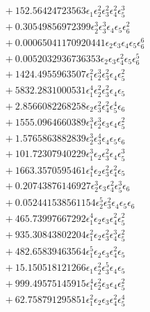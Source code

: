 \documentclass[10pt]{article}
\begin{document}
\begin{align*}
&{}  + 152.56424723563 \epsilon_{1} \epsilon_{2}^{2} \epsilon_{3}^{2} \epsilon_{4}^{2} \epsilon_{5}^{3} \\
&{}  + 0.30549856972399 \epsilon_{2}^{3} \epsilon_{3}^{3} \epsilon_{4} \epsilon_{5} \epsilon_{6}^{2} \\
&{}  + 0.00065041170920441 \epsilon_{2} \epsilon_{3} \epsilon_{4} \epsilon_{5} \epsilon_{6}^{6} \\
&{}  + 0.0052032936736353 \epsilon_{2} \epsilon_{3} \epsilon_{4}^{2} \epsilon_{5} \epsilon_{6}^{5} \\
&{}  + 1424.4955963507 \epsilon_{1}^{2} \epsilon_{2}^{3} \epsilon_{3}^{2} \epsilon_{4} \epsilon_{5}^{2} \\
&{}  + 5832.2831000531 \epsilon_{1}^{4} \epsilon_{2}^{2} \epsilon_{3}^{2} \epsilon_{4} \epsilon_{5} \\
&{}  + 2.8566082268258 \epsilon_{2} \epsilon_{3}^{2} \epsilon_{4}^{2} \epsilon_{5}^{4} \epsilon_{6} \\
&{}  + 1555.0964660389 \epsilon_{1}^{3} \epsilon_{2}^{3} \epsilon_{3} \epsilon_{4} \epsilon_{5}^{2} \\
&{}  + 1.5765863882839 \epsilon_{2}^{3} \epsilon_{3}^{4} \epsilon_{4} \epsilon_{5} \epsilon_{6} \\
&{}  + 101.72307940229 \epsilon_{1}^{3} \epsilon_{2} \epsilon_{3}^{2} \epsilon_{4} \epsilon_{5}^{3} \\
&{}  + 1663.3570595461 \epsilon_{1}^{4} \epsilon_{2} \epsilon_{3}^{2} \epsilon_{4}^{2} \epsilon_{5} \\
&{}  + 0.20743876146927 \epsilon_{2}^{3} \epsilon_{3} \epsilon_{4}^{2} \epsilon_{5}^{3} \epsilon_{6} \\
&{}  + 0.052441538561154 \epsilon_{2}^{5} \epsilon_{3}^{2} \epsilon_{4} \epsilon_{5} \epsilon_{6} \\
&{}  + 465.73997667292 \epsilon_{1}^{4} \epsilon_{2} \epsilon_{3} \epsilon_{4}^{2} \epsilon_{5}^{2} \\
&{}  + 935.30843802204 \epsilon_{1}^{2} \epsilon_{2} \epsilon_{3}^{2} \epsilon_{4}^{3} \epsilon_{5}^{2} \\
&{}  + 482.65839463564 \epsilon_{1}^{5} \epsilon_{2} \epsilon_{3} \epsilon_{4}^{2} \epsilon_{5} \\
&{}  + 15.150518121266 \epsilon_{1} \epsilon_{2}^{2} \epsilon_{3}^{5} \epsilon_{4} \epsilon_{5} \\
&{}  + 999.49575145915 \epsilon_{1}^{4} \epsilon_{2}^{2} \epsilon_{3} \epsilon_{4} \epsilon_{5}^{2} \\
&{}  + 62.758791295851 \epsilon_{1}^{2} \epsilon_{2} \epsilon_{3} \epsilon_{4}^{2} \epsilon_{5}^{4} \\

\end{align*}
\end{document}
